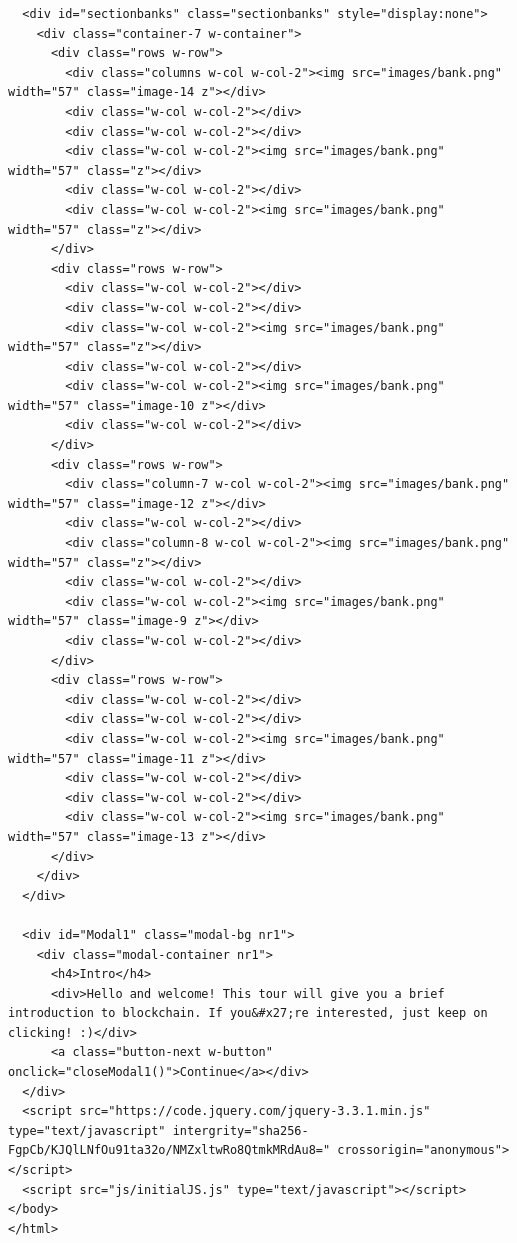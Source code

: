 \begin{lstlisting}
  <div id="sectionbanks" class="sectionbanks" style="display:none">
    <div class="container-7 w-container">
      <div class="rows w-row">
        <div class="columns w-col w-col-2"><img src="images/bank.png" width="57" class="image-14 z"></div>
        <div class="w-col w-col-2"></div>
        <div class="w-col w-col-2"></div>
        <div class="w-col w-col-2"><img src="images/bank.png" width="57" class="z"></div>
        <div class="w-col w-col-2"></div>
        <div class="w-col w-col-2"><img src="images/bank.png" width="57" class="z"></div>
      </div>
      <div class="rows w-row">
        <div class="w-col w-col-2"></div>
        <div class="w-col w-col-2"></div>
        <div class="w-col w-col-2"><img src="images/bank.png" width="57" class="z"></div>
        <div class="w-col w-col-2"></div>
        <div class="w-col w-col-2"><img src="images/bank.png" width="57" class="image-10 z"></div>
        <div class="w-col w-col-2"></div>
      </div>
      <div class="rows w-row">
        <div class="column-7 w-col w-col-2"><img src="images/bank.png" width="57" class="image-12 z"></div>
        <div class="w-col w-col-2"></div>
        <div class="column-8 w-col w-col-2"><img src="images/bank.png" width="57" class="z"></div>
        <div class="w-col w-col-2"></div>
        <div class="w-col w-col-2"><img src="images/bank.png" width="57" class="image-9 z"></div>
        <div class="w-col w-col-2"></div>
      </div>
      <div class="rows w-row">
        <div class="w-col w-col-2"></div>
        <div class="w-col w-col-2"></div>
        <div class="w-col w-col-2"><img src="images/bank.png" width="57" class="image-11 z"></div>
        <div class="w-col w-col-2"></div>
        <div class="w-col w-col-2"></div>
        <div class="w-col w-col-2"><img src="images/bank.png" width="57" class="image-13 z"></div>
      </div>
    </div>
  </div>

  <div id="Modal1" class="modal-bg nr1">
    <div class="modal-container nr1">
      <h4>Intro</h4>
      <div>Hello and welcome! This tour will give you a brief introduction to blockchain. If you&#x27;re interested, just keep on clicking! :)</div>
      <a class="button-next w-button" onclick="closeModal1()">Continue</a></div>
  </div>
  <script src="https://code.jquery.com/jquery-3.3.1.min.js" type="text/javascript" intergrity="sha256-FgpCb/KJQlLNfOu91ta32o/NMZxltwRo8QtmkMRdAu8=" crossorigin="anonymous"></script>
  <script src="js/initialJS.js" type="text/javascript"></script>
</body>
</html>

\end{lstlisting}

